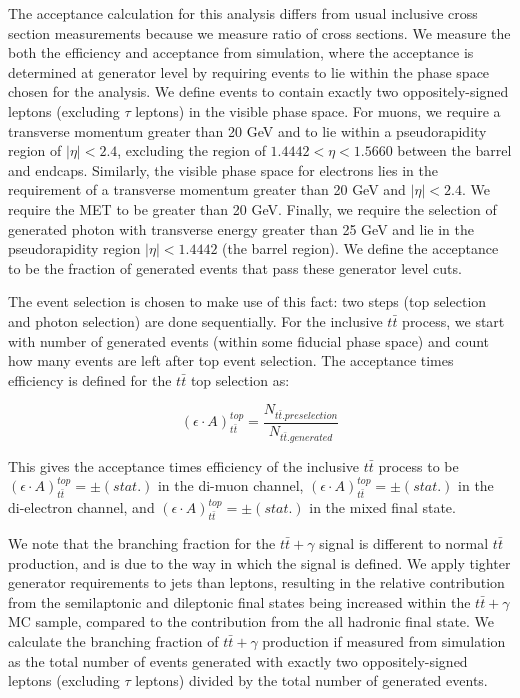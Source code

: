 The acceptance calculation for this analysis differs from usual inclusive cross section measurements because we measure ratio of cross sections. We measure the both the efficiency and acceptance from simulation, where the acceptance is determined at generator level by requiring events to lie within the phase space chosen for the analysis. We define events to contain exactly two oppositely-signed leptons (excluding $\tau$ leptons) in the visible phase space. For muons, we require a transverse momentum greater than 20 GeV and to lie within a pseudorapidity region of $|\eta| < 2.4$, excluding the region of $1.4442 < \eta < 1.5660$ between the barrel and endcaps. Similarly, the visible phase space for electrons lies in the requirement of a transverse momentum greater than 20 GeV and $|\eta| < 2.4$. We require the MET to be greater than 20 GeV. Finally, we require the selection of generated photon with transverse energy greater than 25 GeV and lie in the pseudorapidity region $|\eta| < 1.4442$ (the barrel region). We define the acceptance to be the fraction of generated events that pass these generator level cuts. 


The event selection is chosen to make use of this fact: two steps (top selection and photon selection) are done sequentially. For the inclusive $t\bar{t}$ process, we start with number of generated events (within some fiducial phase space) and count how many events are left after top event selection. The acceptance times efficiency is defined for the $t\bar{t}$ top selection as:

\begin{equation}
	(\epsilon \cdot A)_{t\bar{t}}^{top} = \frac{N_{t\bar{t}.preselection}}{N_{t\bar{t}.generated}} 
\end{equation}

This gives the acceptance times efficiency of the inclusive $t\bar{t}$ process to be $(\epsilon \cdot A)_{t\bar{t}}^{top} =   \pm  (stat.)$ in the di-muon channel, $(\epsilon \cdot A)_{t\bar{t}}^{top} =  \pm  (stat.)$ in the di-electron channel, and $(\epsilon \cdot A)_{t\bar{t}}^{top} =  \pm  (stat.)$ in the mixed final state.

We note that the branching fraction for the $t\bar{t}+\gamma$ signal is different to normal $t\bar{t}$ production, and is due to the way in which the signal is defined.  We apply tighter generator requirements to jets than leptons, resulting in the relative contribution from the semilaptonic and dileptonic final states being increased within the $t\bar{t}+\gamma$ MC sample, compared to the contribution from the all hadronic final state. We calculate the branching fraction of $t\bar{t}+\gamma$ production if measured from simulation as the total number of events generated with exactly two oppositely-signed leptons (excluding $\tau$ leptons) divided by the total number of generated events. 

